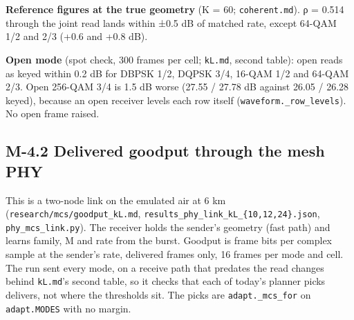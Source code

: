 \documentclass[10pt,letterpaper,twocolumn]{article}
\begin{document}

\textbf{Reference figures at the true geometry} (K = 60; \texttt{coherent.\allowbreak{}md}). ρ = 0.514 through the joint read lands within ±0.5 dB of matched rate, except 64-QAM 1/2 and 2/3 (+0.6 and +0.8 dB).

\textbf{Open mode} (spot check, 300 frames per cell; \texttt{kL.\allowbreak{}md}, second table): open reads as keyed within 0.2 dB for DBPSK 1/2, DQPSK 3/4, 16-QAM 1/2 and 64-QAM 2/3. Open 256-QAM 3/4 is 1.5 dB worse (27.55 / 27.78 dB against 26.05 / 26.28 keyed), because an open receiver levels each row itself (\texttt{waveform.\allowbreak{}\_\allowbreak{}row\_\allowbreak{}levels}). No open frame raised.

\subsection{M-4.2 Delivered goodput through the mesh PHY}\label{m-42-delivered-goodput-through-the-mesh-phy}

This is a two-node link on the emulated air at 6 km (\texttt{research/\allowbreak{}mcs/\allowbreak{}goodput\_\allowbreak{}kL.\allowbreak{}md}, \texttt{results\_\allowbreak{}phy\_\allowbreak{}link\_\allowbreak{}kL\_\allowbreak{}\{10,\allowbreak{}12,\allowbreak{}24\}.\allowbreak{}json}, \texttt{phy\_\allowbreak{}mcs\_\allowbreak{}link.\allowbreak{}py}). The receiver holds the sender's geometry (fast path) and learns family, M and rate from the burst. Goodput is frame bits per complex sample at the sender's rate, delivered frames only, 16 frames per mode and cell. The run sent every mode, on a receive path that predates the read changes behind \texttt{kL.\allowbreak{}md}'s second table, so it checks that each of today's planner picks delivers, not where the thresholds sit. The picks are \texttt{adapt.\allowbreak{}\_\allowbreak{}mcs\_\allowbreak{}for} on \texttt{adapt.\allowbreak{}MODES} with no margin.
\end{document}
